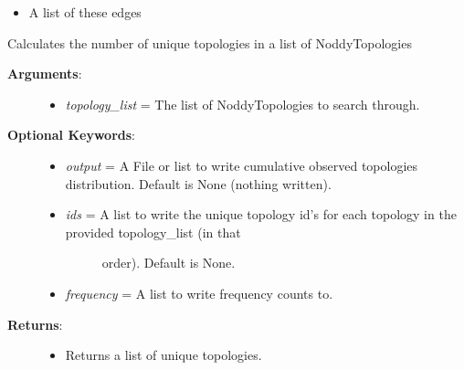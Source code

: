 \documentclass[a4paper,10pt,english]{sphinxmanual}
\begin{document}
\begin{fulllineitems}
\begin{fulllineitems}
\begin{description}
\begin{itemize}
\item {} 
A list of these edges

\end{itemize}

\end{description}

\end{fulllineitems}


\begin{fulllineitems}
\label{pynoddy:pynoddy.output.NoddyTopology.calculate_unique_topologies}
Calculates the number of unique topologies in a list of NoddyTopologies
\begin{description}
\item[{\textbf{Arguments}:}] \leavevmode\begin{itemize}
\item {} 
\emph{topology\_list} = The list of NoddyTopologies to search through.

\end{itemize}

\item[{\textbf{Optional Keywords}:}] \leavevmode\begin{itemize}
\item {} 
\emph{output} = A File or list to write cumulative observed topologies distribution. Default is None (nothing written).

\item {} \begin{description}
\item[{\emph{ids} = A list to write the unique topology id's for each topology in the provided topology\_list (in that }] \leavevmode
order). Default is None.

\end{description}

\item {} 
\emph{frequency} = A list to write frequency counts to.

\end{itemize}

\item[{\textbf{Returns}:}] \leavevmode\begin{itemize}
\item {} 
Returns a list of unique topologies.


\end{itemize}
\end{description}
\end{fulllineitems}
\end{fulllineitems}
\end{document}
